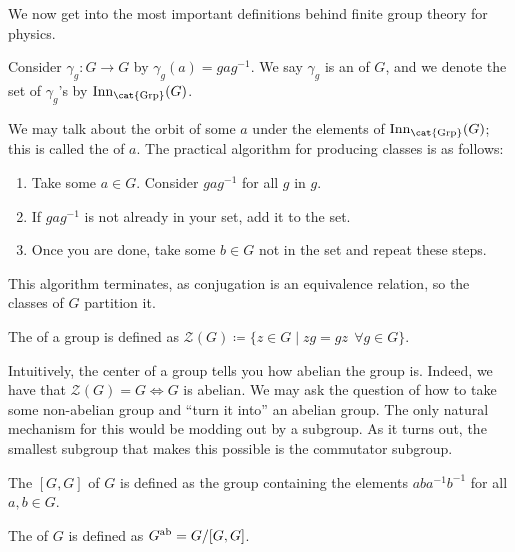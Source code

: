 \documentclass[11pt]{article}
\begin{document}
We now get into the most important definitions behind finite
group theory for physics.

\begin{definition}
    Consider $\gamma_g \colon G \to G$ by $\gamma_g(a) = g a g^{-1}$.
    We say $\gamma_g$ is an  of $G$, and we
    denote the set of $\gamma_g$'s by $\operatorname{Inn}_{\text{\cat{Grp}}}(G)$.
\end{definition}

We may talk about the orbit of some $a$ under the elements of 
$\operatorname{Inn}_{\text{\cat{Grp}}}(G)$; this is called the
 of $a$. The practical algorithm for producing classes
is as follows:
\begin{enumerate}
    \item Take some $a \in G$. Consider $g a g^{-1}$ for all $g$
    in $g$.
    \item If $g a g^{-1}$ is not already in your set, add it to the
    set.
    \item Once you are done, take some $b \in G$ not in the set
    and repeat these steps.
\end{enumerate}
This algorithm terminates, as conjugation is an equivalence relation,
so the classes of $G$ partition it.


\begin{definition}
    The  of a group is defined as
    $\mathcal{Z}(G) \coloneqq \{ z \in G \mid zg = gz \: \: \forall g \in G \}$.
\end{definition}

Intuitively, the center of a group tells you how abelian the group is.
Indeed, we have that $\mathcal{Z}(G) = G \iff G$ is abelian.
We may ask the question of how to take some non-abelian group
and ``turn it into'' an abelian group. The only natural mechanism
for this would be modding out by a subgroup. As it turns out,
the smallest subgroup that makes this possible is the commutator
subgroup.

\begin{definition}
    The  $[G, G]$ of $G$ is
    defined as the group containing the elements $ab a^{-1} b^{-1}$
    for all $a, b \in G$.
\end{definition}

\begin{definition}
    The  of $G$ is defined as $G^{\rm ab} = G/[G, G]$.
\end{definition}
\end{document}
